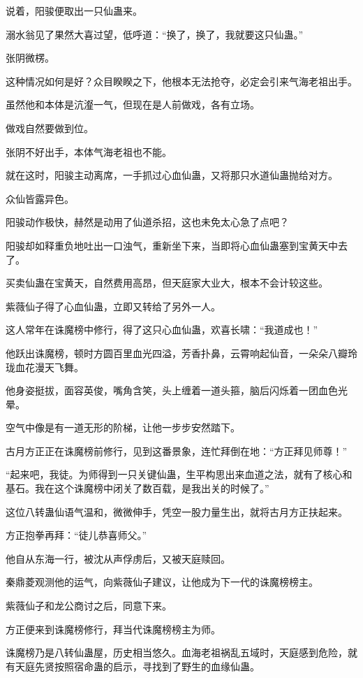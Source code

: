 \begin{this_body}
说着，阳骏便取出一只仙蛊来。

溺水翁见了果然大喜过望，低呼道：“换了，换了，我就要这只仙蛊。”

张阴微楞。

这种情况如何是好？众目睽睽之下，他根本无法抢夺，必定会引来气海老祖出手。

虽然他和本体是沆瀣一气，但现在是人前做戏，各有立场。

做戏自然要做到位。

张阴不好出手，本体气海老祖也不能。

就在这时，阳骏主动离席，一手抓过心血仙蛊，又将那只水道仙蛊抛给对方。

众仙皆露异色。

阳骏动作极快，赫然是动用了仙道杀招，这也未免太心急了点吧？

阳骏却如释重负地吐出一口浊气，重新坐下来，当即将心血仙蛊塞到宝黄天中去了。

买卖仙蛊在宝黄天，自然费用高昂，但天庭家大业大，根本不会计较这些。

紫薇仙子得了心血仙蛊，立即又转给了另外一人。

这人常年在诛魔榜中修行，得了这只心血仙蛊，欢喜长啸：“我道成也！”

他跃出诛魔榜，顿时方圆百里血光四溢，芳香扑鼻，云霄响起仙音，一朵朵八瓣玲珑血花漫天飞舞。

他身姿挺拔，面容英俊，嘴角含笑，头上缠着一道头箍，脑后闪烁着一团血色光晕。

空气中像是有一道无形的阶梯，让他一步步安然踏下。

古月方正正在诛魔榜前修行，见到这番景象，连忙拜倒在地：“方正拜见师尊！”

“起来吧，我徒。为师得到一只关键仙蛊，生平构思出来血道之法，就有了核心和基石。我在这个诛魔榜中闭关了数百载，是我出关的时候了。”

这位八转蛊仙语气温和，微微伸手，凭空一股力量生出，就将古月方正扶起来。

方正抱拳再拜：“徒儿恭喜师父。”

他自从东海一行，被沈从声俘虏后，又被天庭赎回。

秦鼎菱观测他的运气，向紫薇仙子建议，让他成为下一代的诛魔榜榜主。

紫薇仙子和龙公商讨之后，同意下来。

方正便来到诛魔榜修行，拜当代诛魔榜榜主为师。

诛魔榜乃是八转仙蛊屋，历史相当悠久。血海老祖祸乱五域时，天庭感到危险，就有天庭先贤按照宿命蛊的启示，寻找到了野生的血缘仙蛊。


\end{this_body}

